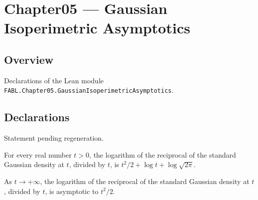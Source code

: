 \chapter{Chapter05 — Gaussian Isoperimetric Asymptotics}
\section{Overview}

Declarations of the Lean module \texttt{FABL.Chapter05.GaussianIsoperimetricAsymptotics}.

\section{Declarations}

\begin{theorem}
\label{FABL.tendsto_standardGaussianUpperQuantile_atBot}
\leanok
{}
Statement pending regeneration.
\end{theorem}

\begin{theorem}
\label{FABL.log_inv_standardGaussianDensity_div}
\leanok
{}
For every real number $t>0$, the logarithm of the reciprocal of the standard Gaussian
density at $t$, divided by $t$, is $t^2/2 + \log t + \log\sqrt{2\pi}$.
\end{theorem}

\begin{theorem}
\label{FABL.log_inv_standardGaussianDensity_div_isEquivalent_sq}
\leanok
{}
As $t\to+\infty$, the logarithm of the reciprocal of the standard Gaussian density at
$t$, divided by $t$, is asymptotic to $t^2/2$.
\end{theorem}

